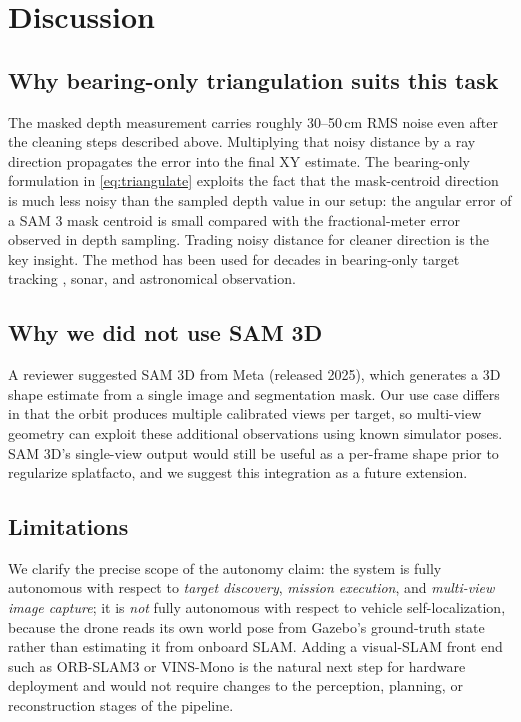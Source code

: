 \documentclass[conference]{IEEEtran}
\begin{document}
\section{Discussion}

\subsection{Why bearing-only triangulation suits this task}

The masked depth measurement carries roughly 30--50\,cm RMS noise
even after the cleaning steps described above. Multiplying that
noisy distance by a ray direction propagates the error into the
final XY estimate. The bearing-only formulation in
\eqref{eq:triangulate} exploits the fact that the mask-centroid
direction is much less noisy than the sampled depth value in our
setup: the angular error of a SAM 3 mask centroid is small compared
with the fractional-meter error observed in depth sampling. Trading
noisy distance for cleaner direction is the key insight. The method
has been used for decades in bearing-only target tracking
\cite{nardone1981bearing}, sonar, and astronomical observation.

\subsection{Why we did not use SAM 3D}

A reviewer suggested SAM 3D from Meta (released 2025), which
generates a 3D shape estimate from a single image and segmentation
mask. Our use case differs in that the orbit produces multiple
calibrated views per target, so multi-view geometry can exploit
these additional observations using known simulator poses. SAM 3D's
single-view output would still be useful as a per-frame shape prior
to regularize splatfacto, and we suggest this integration as a
future extension.

\subsection{Limitations}

We clarify the precise scope of the autonomy claim: the system is
fully autonomous with respect to \emph{target discovery},
\emph{mission execution}, and \emph{multi-view image capture}; it is
\emph{not} fully autonomous with respect to vehicle self-localization,
because the drone reads its own world pose from Gazebo's ground-truth
state rather than estimating it from onboard SLAM. Adding a visual-SLAM
front end such as ORB-SLAM3 or VINS-Mono is the natural next step for
hardware deployment and would not require changes to the perception,
planning, or reconstruction stages of the pipeline.
\end{document}
